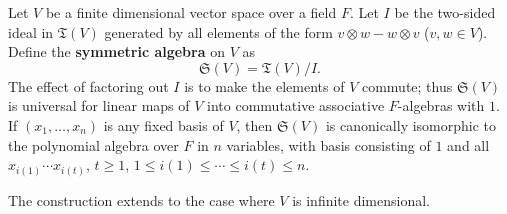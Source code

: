 Let $V$ be a finite dimensional vector space over a field $F$. Let $I$ be the two-sided ideal in $\mathfrak{T}(V)$ generated by all elements of the form $v \otimes w - w \otimes v$ ($v, w \in V$). Define the \textbf{symmetric algebra} on $V$ as
$$\mathfrak{S}(V) = \mathfrak{T}(V) / I.$$
The effect of factoring out $I$ is to make the elements of $V$ commute; thus $\mathfrak{S}(V)$ is universal for linear maps of $V$ into commutative associative $F$-algebras with $1$. If $(x_1, \ldots, x_n)$ is any fixed basis of $V$, then $\mathfrak{S}(V)$ is canonically isomorphic to the polynomial algebra over $F$ in $n$ variables, with basis consisting of $1$ and all $x_{i(1)} \cdots x_{i(t)}$, $t \geq 1$, $1 \leq i(1) \leq \cdots \leq i(t) \leq n$.

The construction extends to the case where $V$ is infinite dimensional.
